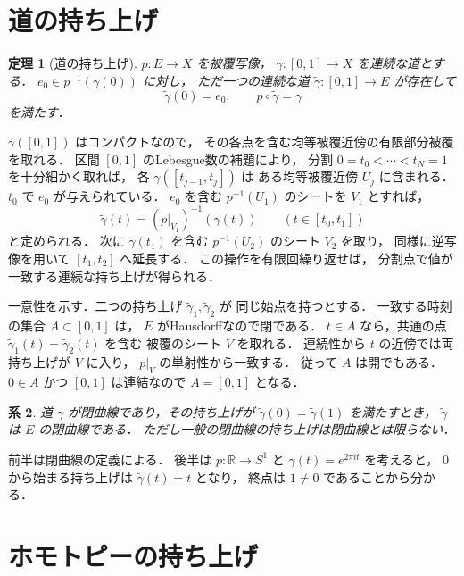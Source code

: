 \documentclass[a5paper,10pt,onecolumn]{jsarticle}
\makeatletter
\theoremstyle{mathnotetheorem}
\newtheorem{theorem}{定理}[section]
\newtheorem{corollary}[theorem]{系}
\renewcommand{\proofname}{証明}
\renewenvironment{proof}[1][\proofname]{%
  \par\pushQED{\qed}\normalfont\topsep4\p@\@plus2\p@\relax
  \trivlist\item[\hskip\labelsep\bfseries #1]\ignorespaces
}{\popQED\endtrivlist\@endpefalse}
\makeatother
\begin{document}
\section{道の持ち上げ}

\begin{theorem}[道の持ち上げ]\label{thm:path-lift}
$p:E\to X$ を被覆写像，
$\gamma:[0,1]\to X$ を連続な道とする．
$e_0\in p^{-1}(\gamma(0))$ に対し，
ただ一つの連続な道
$\widetilde\gamma:[0,1]\to E$ が存在して
\[
 \widetilde\gamma(0)=e_0,\qquad
 p\circ\widetilde\gamma=\gamma
\]
を満たす．
\end{theorem}
\begin{proof}
$\gamma([0,1])$ はコンパクトなので，
その各点を含む均等被覆近傍の有限部分被覆を取れる．
区間 $[0,1]$ のLebesgue数の補題により，
分割
$0=t_0<\cdots<t_N=1$ を十分細かく取れば，
各 $\gamma([t_{j-1},t_j])$ は
ある均等被覆近傍 $U_j$ に含まれる．
$t_0$ で $e_0$ が与えられている．
$e_0$ を含む $p^{-1}(U_1)$ のシートを $V_1$ とすれば，
\[
 \widetilde\gamma(t)
 =(p|_{V_1})^{-1}(\gamma(t))
 \qquad(t\in[t_0,t_1])
\]
と定められる．
次に $\widetilde\gamma(t_1)$ を含む
$p^{-1}(U_2)$ のシート $V_2$ を取り，
同様に逆写像を用いて
$[t_1,t_2]$ へ延長する．
この操作を有限回繰り返せば，
分割点で値が一致する連続な持ち上げが得られる．

一意性を示す．二つの持ち上げ
$\widetilde\gamma_1,\widetilde\gamma_2$ が
同じ始点を持つとする．
一致する時刻の集合 $A\subset[0,1]$ は，
$E$ がHausdorffなので閉である．
$t\in A$ なら，共通の点
$\widetilde\gamma_1(t)=\widetilde\gamma_2(t)$ を含む
被覆のシート $V$ を取れる．
連続性から $t$ の近傍では両持ち上げが $V$ に入り，
$p|_V$ の単射性から一致する．
従って $A$ は開でもある．
$0\in A$ かつ $[0,1]$ は連結なので
$A=[0,1]$ となる．
\end{proof}

\begin{corollary}\label{cor:closed-lift}
道 $\gamma$ が閉曲線であり，その持ち上げが
$\widetilde\gamma(0)=\widetilde\gamma(1)$ を満たすとき，
$\widetilde\gamma$ は $E$ の閉曲線である．
ただし一般の閉曲線の持ち上げは閉曲線とは限らない．
\end{corollary}
\begin{proof}
前半は閉曲線の定義による．
後半は $p:\mathbb R\to S^1$ と
$\gamma(t)=e^{2\pi it}$ を考えると，
$0$ から始まる持ち上げは
$\widetilde\gamma(t)=t$ となり，
終点は $1\ne0$ であることから分かる．
\end{proof}

\section{ホモトピーの持ち上げ}
\end{document}
